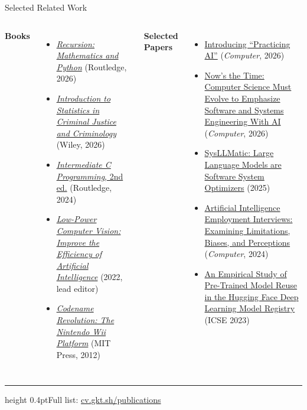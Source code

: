 \documentclass[10pt,aspectratio=1610]{beamer}
\begin{document}
\begin{frame}{Selected Related Work}
\footnotesize
\begin{columns}[T]
\textbf{Books}
\begin{itemize}
\item \href{https://www.routledge.com/Recursion-Mathematics-and-Python/Lu-Thiruvathukal/p/book/9781041149538}{\emph{Recursion: Mathematics and Python}} (Routledge, 2026)
\item \href{https://www.wiley.com/en-us/shop/general-introductory-law/introduction-to-statistics-in-criminal-justice-and-criminology-a-practical-approach-to-calculating-using-and-interpreting-data-p-9781118559307}{\emph{Introduction to Statistics in Criminal Justice and Criminology}} (Wiley, 2026)
\item \href{https://www.routledge.com/Intermediate-C-Programming/Lu-Thiruvathukal/p/book/9781032189819}{\emph{Intermediate C Programming}, 2nd ed.} (Routledge, 2024)
\item \href{https://ecommons.luc.edu/cs_facpubs/281/}{\emph{Low-Power Computer Vision: Improve the Efficiency of Artificial Intelligence}} (2022, lead editor)
\item \href{https://mitpress.mit.edu/9780262016803/codename-revolution/}{\emph{Codename Revolution: The Nintendo Wii Platform}} (MIT Press, 2012)
\end{itemize}
\textbf{Selected Papers}
\begin{itemize}
\item \href{https://doi.org/10.1109/MC.2026.3722450}{Introducing \enquote{Practicing AI}} (\emph{Computer}, 2026)
\item \href{https://doi.org/10.1109/MC.2026.3695220}{Now's the Time: Computer Science Must Evolve to Emphasize Software and Systems Engineering With AI} (\emph{Computer}, 2026)
\item \href{https://doi.org/10.48550/arXiv.2506.01249}{SysLLMatic: Large Language Models are Software System Optimizers} (2025)
\item \href{https://doi.org/10.1109/MC.2024.3404669}{Artificial Intelligence Employment Interviews: Examining Limitations, Biases, and Perceptions} (\emph{Computer}, 2024)
\item \href{https://doi.org/10.1109/ICSE48619.2023.00206}{An Empirical Study of Pre-Trained Model Reuse in the Hugging Face Deep Learning Model Registry} (ICSE 2023)
\end{itemize}
\end{columns}
\vfill{\footnotesize\color{gktmuted}\hrule height 0.4pt\vspace{4pt}Full list: \href{https://cv.gkt.sh/publications/}{cv.gkt.sh/publications}\par}
\end{frame}
\end{document}
